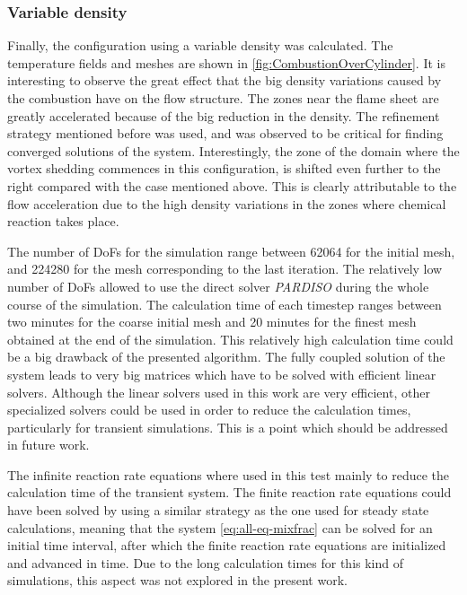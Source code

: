 \FloatBarrier
\subsubsection{Variable density}
Finally, the configuration using a variable density was calculated. The temperature fields and meshes are shown in \cref{fig:CombustionOverCylinder}. It is interesting to observe the great effect that the big density variations caused by the combustion have on the flow structure. The zones near the flame sheet are greatly accelerated because of the big reduction in the density. The refinement strategy mentioned before was used, and was observed to be critical for finding converged solutions of the system.  Interestingly, the zone of the domain where the vortex shedding commences in this configuration, is shifted even further to the right compared with the case mentioned above. This is clearly attributable to the flow acceleration due to the high density variations in the zones where chemical reaction takes place.  %

The number of DoFs for the simulation range between 62064 for the initial mesh, and 224280 for the mesh corresponding to the last iteration. The relatively low number of DoFs allowed to use the direct solver \textit{PARDISO} during the whole course of the simulation. The calculation time of each timestep ranges between two minutes for the coarse initial mesh and 20 minutes for the finest mesh obtained at the end of the simulation. This relatively high calculation time could be a big drawback of the presented algorithm. The fully coupled solution of the system leads to very big matrices which have to be solved with efficient linear solvers. Although the linear solvers used in this work are very efficient, other specialized solvers could be used in order to reduce the calculation times, particularly for transient simulations.  This is a point which should be addressed in future work. 

The infinite reaction rate equations where used in this test mainly to reduce the calculation time of the transient system. The finite reaction rate equations could have been solved by using a similar strategy as the one used for steady state calculations, meaning that the system \cref{eq:all-eq-mixfrac} can be solved for an initial time interval, after which the finite reaction rate equations are initialized and advanced in time. 
Due to the long calculation times for this kind of simulations, this aspect was not explored in the present work.


